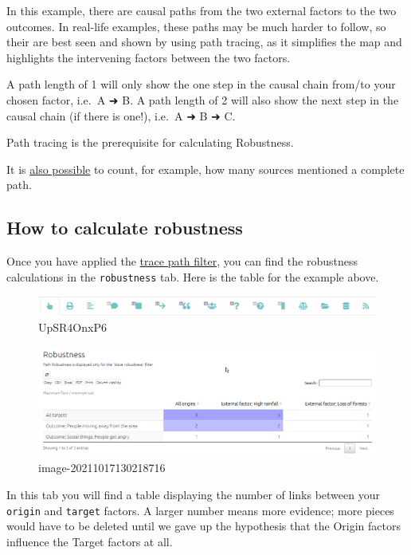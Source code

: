 \documentclass[
]{book}
\begin{document}
In this example, there are causal paths from the two external factors to the two outcomes. In real-life examples, these paths may be much harder to follow, so their are best seen and shown by using path tracing, as it simplifies the map and highlights the intervening factors between the two factors.

A path length of 1 will only show the one step in the causal chain from/to your chosen factor, i.e.~A ➜ B. A path length of 2 will also show the next step in the causal chain (if there is one!), i.e.~A ➜ B ➜ C.

Path tracing is the prerequisite for calculating Robustness.

It is \href{\%7B\#xrobustness-by-field\%7D}{also possible} to count, for example, how many sources mentioned a complete path.

\hypertarget{how-to-calculate-robustness}{%
\subsection{How to calculate robustness}\label{how-to-calculate-robustness}}

Once you have applied the \protect\hyperlink{howtotracepathsandrobustness}{trace path filter}, you can find the robustness calculations in the \texttt{robustness} tab. Here is the table for the example above.

\begin{figure}
\centering
\includegraphics[width=6.77083in,height=\textheight]{_assets/UpSR4OnxP6.gif}
\caption{UpSR4OnxP6}
\end{figure}

\begin{figure}
\centering
\includegraphics[width=6.77083in,height=\textheight]{_assets/image-20211017130218716.png}
\caption{image-20211017130218716}
\end{figure}

In this tab you will find a table displaying the number of links between your \texttt{origin} and \texttt{target} factors. A larger number means more evidence; more pieces would have to be deleted until we gave up the hypothesis that the Origin factors influence the Target factors at all.
\end{document}
